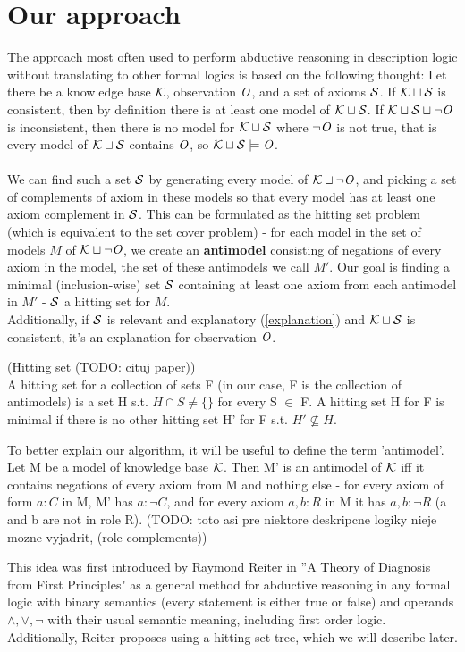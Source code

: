 \chapter{Our approach}\label{chap:proposal}
The approach most often used to perform abductive reasoning in description logic without translating to other formal logics is based on the following thought:
Let there be a knowledge base $\K$, observation $\Obs$, and a set of axioms $\S$. If $\K \sqcup \S$ is consistent, then by definition there is at least one model of $\K \sqcup \S$.  If $\K \sqcup \S \sqcup \neg \Obs$ is inconsistent, then there is no model for $\K \sqcup \S$ where $\neg \Obs$ is not true, that is every model of $\K \sqcup \S$ contains $\Obs$, so $\K \sqcup \S \models \Obs$. \\ \\
We can find such a set $\S$ by generating every model of $\K \sqcup \neg \Obs$, and picking a set of complements of axiom in these models so that every model has at least one axiom complement in $\S$. This can be formulated as the hitting set problem (which is equivalent to the set cover problem) - for each model in the set of models $M$ of  $\K \sqcup \neg \Obs$, we create an \textbf{antimodel} consisting of negations of every axiom in the model, the set of these antimodels we call $M'$. Our goal is finding a minimal (inclusion-wise) set $\S$ containing at least one axiom from each antimodel in $M'$ - $\S$ a hitting set for $M$.
\\

Additionally, if $\S$ is relevant and explanatory (\ref{explanation}) and $\K \sqcup \S$ is consistent, it's an explanation for observation $\Obs$.
\\ 

\begin{mydef} \label{HS} (Hitting set  (TODO: cituj paper)) \\
A hitting set for a collection of
sets F (in our case, F is the collection of antimodels) is a set H s.t. $H \cap S \neq  \{\}$ for every S $\in$ F. A hitting set H for F is
minimal if there is no other hitting set H' for F s.t. $H' \not \subseteq H$.
\end{mydef}
\begin{mydef} \label{Antimodel} 
To better explain our algorithm, it will be useful to define the term 'antimodel'. Let M be a model of knowledge base $\K$. Then M' is an antimodel of $\K$ iff it contains negations of every axiom from M and nothing else - for every axiom of form $a:C$ in M, M' has $a:\neg C$, and for every axiom $a,b:R$ in M it has $a,b:\neg R$ (a and b are not in role R). (TODO: toto asi pre niektore deskripcne logiky nieje mozne vyjadrit, (role complements))
\end{mydef}
This idea was first introduced by Raymond Reiter in ''A Theory of Diagnosis from First Principles" \cite{Reiter1987} as a general method for abductive reasoning in any formal logic with binary semantics (every statement is either true or false) and operands $\land , \lor, \neg$  with their usual semantic meaning, including first order logic. Additionally, Reiter proposes using a hitting set tree, which we will describe later.


